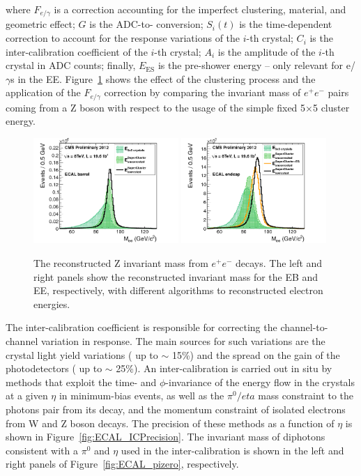 where $F_{e/\gamma}$ is a correction accounting for the imperfect
clustering, material, and geometric effect; $G$ is the ADC-to-\GeV
conversion; $S_{i}(t)$ is the time-dependent correction to account for
the response variations of the $i$-th crystal; $C_{i}$ is the
inter-calibration coefficient of the $i$-th crystal; $A_{i}$ is the
amplitude of the $i$-th crystal in ADC counts; finally,
$E_{\mathrm{ES}}$ is the pre-shower energy -- only relevant for
e/$\gamma$s in the EE. Figure~\ref{fig:ECAL_clusterE} shows the effect
of the clustering process and the application of the $F_{e/\gamma}$
correction by comparing the invariant mass of $e^{+}e^{-}$ pairs
coming from a Z boson with respect to the usage of the simple fixed
5$\times$5 cluster energy.

\begin{figure}
 \centering
\includegraphics[width=0.49\textwidth]{CMS_DetectorFigures/E_corr-EB.png}
\includegraphics[width=0.49\textwidth]{CMS_DetectorFigures/E_corr-EE.png}
\caption{The reconstructed Z invariant mass from $e^{+}e^{-}$
  decays. The left and right panels show the reconstructed invariant mass for
  the EB and EE, respectively, with different algorithms to reconstructed electron energies.\label{fig:ECAL_clusterE}}
\end{figure}

The inter-calibration coefficient is responsible for correcting the
channel-to-channel variation in response. The main sources for such
variations are the crystal light yield variations ( up to $\sim$ 15\%)
and the spread on the gain of the photodetectors ( up to $\sim$
25\%). An inter-calibration is carried out in situ by methods that
exploit the time- and $\phi$-invariance of the energy flow in the
crystals at a given $\eta$ in minimum-bias events, as well as the
$\pi^{0}/eta$ mass constraint to the photons pair from its decay, and
the momentum constraint of isolated electrons from W and Z boson
decays. The precision of these methods as a function of $\eta$ is
shown in Figure~\ref{fig:ECAL_ICPrecision}. The invariant mass of
diphotons consistent with a $\pi^{0}$ and $\eta$ used in the
inter-calibration is shown in the left and right panels of
Figure~\ref{fig:ECAL_pizero}, respectively.

